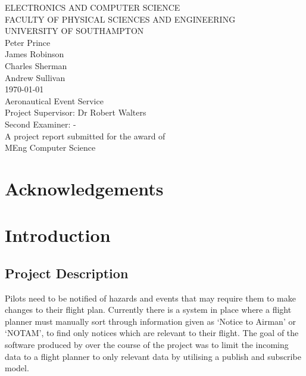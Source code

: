 \documentclass[a4paper, 12pt]{article}
\begin{document}
\begin{titlepage}

	\center

	{\large ELECTRONICS AND COMPUTER SCIENCE}\\[0.2cm]
	{\large FACULTY OF PHYSICAL SCIENCES AND ENGINEERING}\\[0.2cm]
	{\large UNIVERSITY OF SOUTHAMPTON}\\[3cm]

	{\Large Peter Prince}\\[0.2cm]
	{\Large James Robinson}\\[0.2cm]
	{\Large Charles Sherman}\\[0.2cm]
	{\Large Andrew Sullivan}\\[1cm]
	{\Large \today}\\[3cm]

	{\LARGE Aeronautical Event Service}\\[3cm]

	{\large Project Supervisor: Dr Robert Walters}\\[0.2cm]
	{\large Second Examiner: -}\\[2.5cm]

	{\large A project report submitted for the award of}\\[0.2cm]
	{\Large MEng Computer Science}

\end{titlepage}

\begin{abstract}

\end{abstract}

\newpage

\section*{Acknowledgements}

\newpage

\tableofcontents
\newpage

\listoffigures
\newpage

\section{Introduction}
\label{sec:introduction}

\subsection{Project Description}
Pilots need to be notified of hazards and events that may require them to make changes to their flight plan. Currently there is a system in place where a flight planner must manually sort through information given as ‘Notice to Airman’ or ‘NOTAM’, to find only notices which are relevant to their flight. The goal of the software produced by over the course of the project was to limit the incoming data to a flight planner to only relevant data by utilising a publish and subscribe model.
\end{document}
